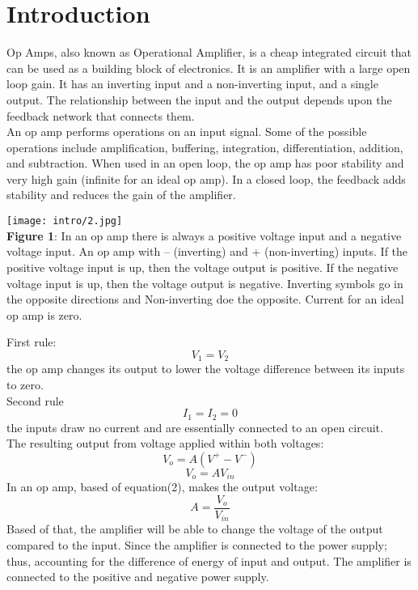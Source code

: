 \documentclass[11pt]{article}
\begin{document}
\section*{Introduction}
Op Amps, also known as Operational Amplifier, is a cheap integrated circuit that can be used as a building block of electronics. It is an amplifier with a large open loop gain. It has an inverting input and a non-inverting input, and a single output. The relationship between the input and the output depends upon the feedback network that connects them.\\
An op amp performs operations on an input signal. Some of the possible operations include amplification, buffering, integration, differentiation, addition, and subtraction. When used in an open loop, the op amp has poor stability and very high gain (infinite for an ideal op amp). In a closed loop, the feedback adds stability and reduces the gain of the amplifier.
\begin{center}
    \texttt{[image: intro/2.jpg]}\\\textbf{Figure 1}: In an op amp there is always a positive voltage input and a negative voltage input. An op amp with – (inverting) and + (non-inverting) inputs. If the positive voltage input is up, then the voltage output is positive. If the negative voltage input is up, then the voltage output is negative. Inverting symbols go in the opposite directions and Non-inverting doe the opposite. Current for an ideal op amp is zero.  
\end{center}
First rule:
\begin{equation}
    V_1=V_2
\end{equation}
the op amp changes its output to lower the voltage difference between its inputs to zero.\\
Second rule
\begin{equation}
    I_1=I_2=0
\end{equation} 
the inputs draw no current and are essentially connected to an open circuit. 
\\The resulting output from voltage applied within both voltages:
\begin{equation}
    V_o=A(V^+ - V^-)
\end{equation}
\begin{equation}
    V_o=AV_{in}
\end{equation}
In an op amp, based of equation(2), makes the output voltage:
\begin{equation}
    A=\frac{V_o}{V_{in}}
\end{equation}
Based of that, the amplifier will be able to change the voltage of the output compared to the input. Since the amplifier is connected to the power supply; thus, accounting for the difference of energy of input and output. The amplifier is connected to the positive and negative power supply.\\
\end{document}
